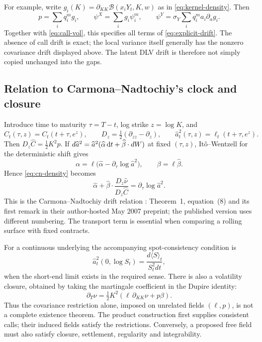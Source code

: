 \documentclass[11pt,a4paper]{article}
\numberwithin{equation}{section}
\theoremstyle{definition}\newtheorem{definition}[theorem]{Definition}
\theoremstyle{remark}\newtheorem{remark}[theorem]{Remark}
\newcommand{\Black}{\mathcal B}\newcommand{\LC}{\mathcal L}
\begin{document}
For example, write $g_i(K)=\partial_{KK}\Black(x_iY_t,K,w)$ as in \eqref{eq:kernel-density}. Then
\[
 p=\sum_iq_i^mg_i,\qquad
 \psi^X=\sum_i g_i\psi_i^m,\qquad
 \psi^Y=\sigma_Y\sum_iq_i^m a_i\partial_a g_i.
\]
Together with \eqref{eq:call-vol}, this specifies all terms of \eqref{eq:explicit-drift}. The absence of call drift is exact; the local variance itself generally has the nonzero covariance drift displayed above. The latent DLV drift is therefore not simply copied unchanged into the gaps.

\subsection{Relation to Carmona--Nadtochiy's clock and closure}
Introduce time to maturity $\tau=T-t$, log strike $z=\log K$, and
\[
 \widehat C_t(\tau,z)=C_t(t+\tau,e^z),\qquad
 D_z=\tfrac12(\partial_{zz}-\partial_z),\qquad
 \widehat a^2_t(\tau,z)=\ell_t(t+\tau,e^z).
\]
Then $D_z\widehat C=\tfrac12K^2p$. If $d\widehat a^2=\widehat a^2(\widehat\alpha\,\mathrm dt+\widehat\beta\cdot dW)$ at fixed $(\tau,z)$, It\^o--Wentzell for the deterministic shift gives
\[
 \alpha=\ell\bigl(\widehat\alpha-\partial_\tau\log\widehat a^2\bigr),
 \qquad \beta=\ell\widehat\beta.
\]
Hence \eqref{eq:cn-density} becomes
\begin{equation}
 \widehat\alpha+
 \widehat\beta\cdot\frac{D_z\widehat\nu}{D_z\widehat C}
 =\partial_\tau\log\widehat a^2.
 \label{eq:cn-musiela}
\end{equation}
This is the Carmona--Nadtochiy drift relation \cite{CN2009}: Theorem~1, equation~(8) and its first remark in their author-hosted May 2007 preprint; the published version uses different numbering. The transport term is essential when comparing a rolling surface with fixed contracts.

For a continuous underlying the accompanying spot-consistency condition is
\[
 \widehat a_t^2(0,\log S_t)=\frac{d\langle S\rangle_t}{S_t^2dt},
\]
when the short-end limit exists in the required sense. There is also a volatility closure, obtained by taking the martingale coefficient in the Dupire identity:
\begin{equation}
 \partial_T\nu=\tfrac12K^2(\ell\,\partial_{KK}\nu+p\beta).
 \label{eq:closure}
\end{equation}
Thus the covariance restriction alone, imposed on unrelated fields $(\ell,p)$, is not a complete existence theorem. The product construction first supplies consistent calls; their induced fields satisfy the restrictions. Conversely, a proposed free field must also satisfy closure, settlement, regularity and integrability.
\end{document}
